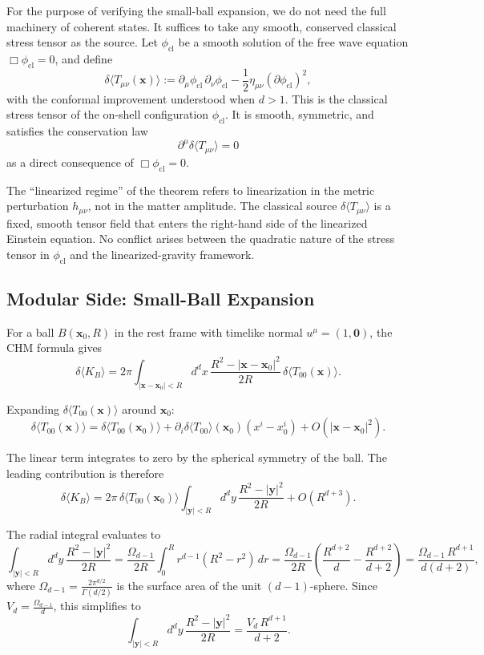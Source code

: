 \documentclass[12pt]{article}
\theoremstyle{definition}
\theoremstyle{remark}
\begin{document}
For the purpose of verifying the small-ball expansion, we do not need the full machinery of coherent states. It suffices to take any smooth, conserved classical stress tensor as the source. Let \(\phi_{\mathrm{cl}}\) be a smooth solution of the free wave equation \(\Box\phi_{\mathrm{cl}} = 0\), and define
\[
\delta\langle T_{\mu\nu}(\mathbf{x})\rangle
:=
\partial_\mu\phi_{\mathrm{cl}}\,\partial_\nu\phi_{\mathrm{cl}}
-
\frac{1}{2}\eta_{\mu\nu}(\partial\phi_{\mathrm{cl}})^2,
\]
with the conformal improvement understood when \(d > 1\). This is the classical stress tensor of the on-shell configuration \(\phi_{\mathrm{cl}}\). It is smooth, symmetric, and satisfies the conservation law
\[
\partial^\mu\delta\langle T_{\mu\nu}\rangle = 0
\]
as a direct consequence of \(\Box\phi_{\mathrm{cl}} = 0\).

The ``linearized regime'' of the theorem refers to linearization in the metric perturbation \(h_{\mu\nu}\), not in the matter amplitude. The classical source \(\delta\langle T_{\mu\nu}\rangle\) is a fixed, smooth tensor field that enters the right-hand side of the linearized Einstein equation. No conflict arises between the quadratic nature of the stress tensor in \(\phi_{\mathrm{cl}}\) and the linearized-gravity framework.

\subsection{Modular Side: Small-Ball Expansion}\label{subsec:5.3}

For a ball \(B(\mathbf{x}_0, R)\) in the rest frame with timelike normal \(u^\mu = (1, \mathbf{0})\), the CHM formula gives
\[
\delta\langle K_B\rangle
=
2\pi \int_{|\mathbf{x}-\mathbf{x}_0| < R} d^d x\,
\frac{R^2 - |\mathbf{x}-\mathbf{x}_0|^2}{2R}\,
\delta\langle T_{00}(\mathbf{x})\rangle.
\]

Expanding \(\delta\langle T_{00}(\mathbf{x})\rangle\) around \(\mathbf{x}_0\):
\[
\delta\langle T_{00}(\mathbf{x})\rangle
=
\delta\langle T_{00}(\mathbf{x}_0)\rangle
+
\partial_i\delta\langle T_{00}\rangle(\mathbf{x}_0)(x^i - x_0^i)
+
O(|\mathbf{x}-\mathbf{x}_0|^2).
\]

The linear term integrates to zero by the spherical symmetry of the ball. The leading contribution is therefore
\[
\delta\langle K_B\rangle
=
2\pi\,\delta\langle T_{00}(\mathbf{x}_0)\rangle
\int_{|\mathbf{y}| < R} d^d y\,
\frac{R^2 - |\mathbf{y}|^2}{2R}
+
O(R^{d+3}).
\]

The radial integral evaluates to
\[
\int_{|\mathbf{y}| < R} d^d y\,
\frac{R^2 - |\mathbf{y}|^2}{2R}
=
\frac{\Omega_{d-1}}{2R}
\int_0^R r^{d-1}(R^2 - r^2)\,dr
=
\frac{\Omega_{d-1}}{2R}\left(\frac{R^{d+2}}{d} - \frac{R^{d+2}}{d+2}\right)
=
\frac{\Omega_{d-1}\,R^{d+1}}{d(d+2)},
\]
where \(\Omega_{d-1} = \frac{2\pi^{d/2}}{\Gamma(d/2)}\) is the surface area of the unit \((d-1)\)-sphere. Since \(V_d = \frac{\Omega_{d-1}}{d}\), this simplifies to
\[
\int_{|\mathbf{y}| < R} d^d y\,
\frac{R^2 - |\mathbf{y}|^2}{2R}
=
\frac{V_d\,R^{d+1}}{d+2}.
\]
\end{document}
